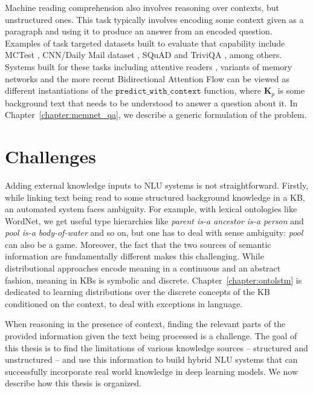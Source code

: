 Machine reading comprehension also involves reasoning over contexts, but unstructured ones. This task typically involves encoding some context given as a paragraph and using it to
produce an answer from an encoded question. Examples of task targeted datasets built to evaluate that capability include MCTest \cite{Richardson2013MCTestAC},
CNN/Daily Mail dataset \cite{hermann2015teaching}, SQuAD \cite{Rajpurkar2016SQuAD10} and TriviQA \cite{Joshi2017TriviaQAAL}, among others.
Systems built for these tasks including attentive readers \cite{hermann2015teaching}, variants of memory networks \cite{weston2014memory,Sukhbaatar2015EndToEndMN,Xiong2016DynamicMN}
and the more recent Bidirectional Attention Flow \cite{Seo2016BidirectionalAF} can be viewed as different instantiations
of the $\mathtt{predict\_with\_context}$ function, where $\textbf{K}_p$ is some background text that needs to be understood to answer a question about it. 
In Chapter~\ref{chapter:memnet_qa}, we describe a generic formulation of the problem.

\section{Challenges}

Adding external knowledge inputs to NLU systems is not straightforward.  Firstly, while linking text being read to some structured background knowledge
in a KB, an automated system faces ambiguity. For example, with lexical ontologies like WordNet, 
we get useful type hierarchies like \textit{parent is-a ancestor is-a person} and \textit{pool is-a body-of-water} 
and so on, but one has to deal with sense ambiguity: \textit{pool} can also be a game. Moreover, the fact that the two sources of semantic information are fundamentally different 
makes this challenging. While distributional approaches encode meaning in a
continuous and an abstract fashion, meaning in KBs is symbolic and discrete. Chapter~\ref{chapter:ontolstm} is dedicated to learning 
distributions over the discrete concepts of the KB conditioned on the context, to deal with exceptions in language.


When reasoning in the presence of context, finding the 
relevant parts of the provided information given the text being processed is a challenge. 
The goal of this thesis is to find the limitations of various knowledge sources -- structured and unstructured -- and use this information 
to build hybrid NLU systems that can successfully incorporate real world knowledge in deep learning models. We now describe how this thesis is organized.

